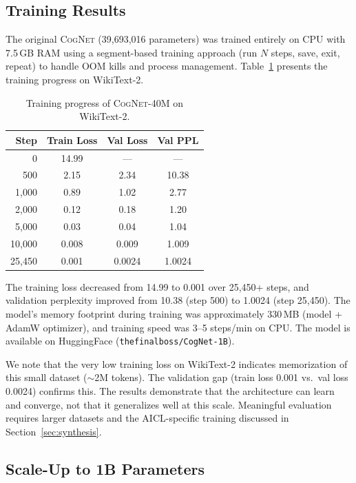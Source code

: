 \documentclass[11pt]{article}
\newcommand{\aicl}{\textsc{AICL}}
\newcommand{\cognet}{\textsc{CogNet}}
\begin{document}
\subsection{Training Results}
\label{sec:cognet:training}

The original \cognet{} (39,693,016 parameters) was trained entirely on CPU with 7.5\,GB RAM using a segment-based training approach (run $N$ steps, save, exit, repeat) to handle OOM kills and process management. Table~\ref{tab:training} presents the training progress on WikiText-2.

\begin{table}[htbp]
\centering
\caption{Training progress of \cognet{}-40M on WikiText-2.}
\label{tab:training}
\begin{tabular}{@{}rccc@{}}
\toprule
\textbf{Step} & \textbf{Train Loss} & \textbf{Val Loss} & \textbf{Val PPL} \\
\midrule
0       & 14.99  & ---    & ---    \\
500     & 2.15   & 2.34   & 10.38  \\
1{,}000 & 0.89   & 1.02   & 2.77   \\
2{,}000 & 0.12   & 0.18   & 1.20   \\
5{,}000 & 0.03   & 0.04   & 1.04   \\
10{,}000 & 0.008  & 0.009  & 1.009  \\
25{,}450 & 0.001  & 0.0024 & 1.0024 \\
\bottomrule
\end{tabular}
\end{table}

The training loss decreased from 14.99 to 0.001 over 25,450+ steps, and validation perplexity improved from 10.38 (step 500) to 1.0024 (step 25,450). The model's memory footprint during training was approximately 330\,MB (model + AdamW optimizer), and training speed was 3--5 steps/min on CPU. The model is available on HuggingFace (\texttt{thefinalboss/CogNet-1B}).

We note that the very low training loss on WikiText-2 indicates memorization of this small dataset ($\sim$2M tokens). The validation gap (train loss 0.001 vs.\ val loss 0.0024) confirms this. The results demonstrate that the architecture can learn and converge, not that it generalizes well at this scale. Meaningful evaluation requires larger datasets and the \aicl{}-specific training discussed in Section~\ref{sec:synthesis}.

\subsection{Scale-Up to 1B Parameters}
\label{sec:cognet:scaleup}
\end{document}
